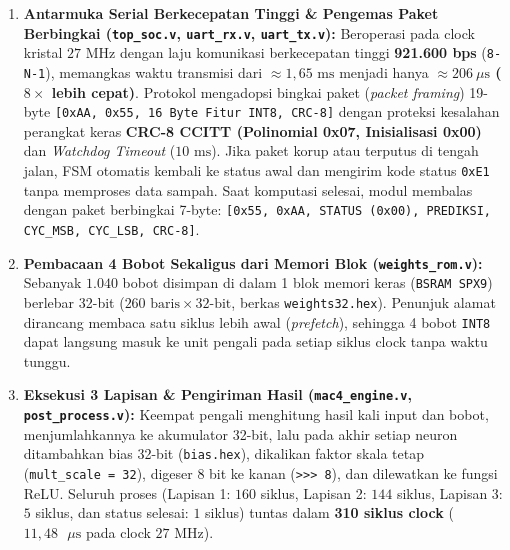 \documentclass[12pt,a4paper]{article}
\begin{document}
\begin{enumerate}[leftmargin=0.7cm, itemsep=3pt]
    \item \textbf{Antarmuka Serial Berkecepatan Tinggi \& Pengemas Paket Berbingkai (\texttt{top\_soc.v}, \texttt{uart\_rx.v}, \texttt{uart\_tx.v}):}
    Beroperasi pada clock kristal $27\text{ MHz}$ dengan laju komunikasi berkecepatan tinggi \textbf{921.600 bps} (\texttt{8-N-1}), memangkas waktu transmisi dari $\approx 1{,}65\text{ ms}$ menjadi hanya \textbf{$\approx 206\ \mu\text{s}$ ($8\times$ lebih cepat)}. Protokol mengadopsi bingkai paket (\textit{packet framing}) 19-byte \texttt{[0xAA, 0x55, 16 Byte Fitur INT8, CRC-8]} dengan proteksi kesalahan perangkat keras \textbf{CRC-8 CCITT (Polinomial 0x07, Inisialisasi 0x00)} dan \textit{Watchdog Timeout} ($10\text{ ms}$). Jika paket korup atau terputus di tengah jalan, FSM otomatis kembali ke status awal dan mengirim kode status \texttt{0xE1} tanpa memproses data sampah. Saat komputasi selesai, modul membalas dengan paket berbingkai 7-byte: \texttt{[0x55, 0xAA, STATUS (0x00), PREDIKSI, CYC\_MSB, CYC\_LSB, CRC-8]}.
    \item \textbf{Pembacaan 4 Bobot Sekaligus dari Memori Blok (\texttt{weights\_rom.v}):}
    Sebanyak $1.040$ bobot disimpan di dalam 1 blok memori keras (\texttt{BSRAM SPX9}) berlebar 32-bit ($260\text{ baris} \times 32\text{-bit}$, berkas \texttt{weights32.hex}). Penunjuk alamat dirancang membaca satu siklus lebih awal (\textit{prefetch}), sehingga 4 bobot \texttt{INT8} dapat langsung masuk ke unit pengali pada setiap siklus clock tanpa waktu tunggu.
    \item \textbf{Eksekusi 3 Lapisan \& Pengiriman Hasil (\texttt{mac4\_engine.v}, \texttt{post\_process.v}):}
    Keempat pengali menghitung hasil kali input dan bobot, menjumlahkannya ke akumulator 32-bit, lalu pada akhir setiap neuron ditambahkan bias 32-bit (\texttt{bias.hex}), dikalikan faktor skala tetap (\texttt{mult\_scale = 32}), digeser 8 bit ke kanan (\texttt{>>> 8}), dan dilewatkan ke fungsi ReLU. Seluruh proses (Lapisan 1: $160$ siklus, Lapisan 2: $144$ siklus, Lapisan 3: $5$ siklus, dan status selesai: $1$ siklus) tuntas dalam \textbf{310 siklus clock} ($11{,}48\text{ }\mu\text{s}$ pada clock $27\text{ MHz}$).
\end{enumerate}
\end{document}
